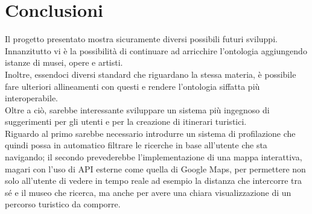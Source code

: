 \documentclass[12pt]{article}
\begin{document}
\section{Conclusioni}
Il progetto presentato mostra sicuramente diversi possibili futuri sviluppi. Innanzitutto vi è la possibilità di continuare ad arricchire l'ontologia
aggiungendo istanze di musei, opere e artisti.\\
Inoltre, essendoci diversi standard che riguardano la stessa materia, è possibile fare ulteriori
allineamenti con questi e rendere l'ontologia siffatta più interoperabile. \\
Oltre a ciò, sarebbe interessante sviluppare un sistema più ingegnoso di suggerimenti per gli utenti e per la creazione di itinerari turistici.\\
Riguardo al primo sarebbe necessario introdurre un sistema di profilazione che quindi possa in automatico filtrare le ricerche in base all'utente che sta navigando;
il secondo prevederebbe l'implementazione di una mappa interattiva, magari con l'uso di API esterne come quella di Google Maps, per permettere non solo all'utente
di vedere in tempo reale ad esempio la distanza che intercorre tra sé e il museo che ricerca, ma anche per avere una chiara visualizzazione di un percorso turistico
da comporre.
\newpage
\printbibliography
\end{document}
